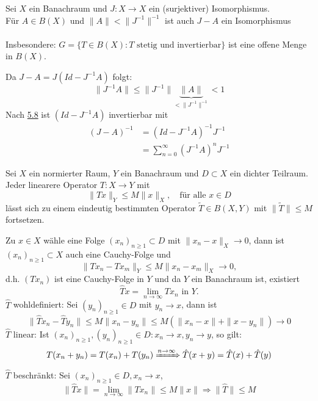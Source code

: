 \begin{kor} \label{kor:5.9}
	Sei $X$ ein Banachraum und $J: X \rightarrow X$ ein (surjektiver) Isomorphismus. \\
	Für $A \in B(X)$ und $\| A \| < \| J^{-1} \|^{-1}$ ist auch $J - A$ ein Isomorphismus \\ \\
	Insbesondere: $G = \{ T \in B(X): T \text{ stetig und invertierbar} \}$ ist eine offene Menge in $B(X)$.
	\begin{beweis}
		Da $J - A = J (Id - J^{-1}A) $ folgt:
		\[ \| J^{-1} A \| \leq \| J^{-1} \| \underbrace{\| A \|}_{< \| J^{-1} \|^{-1}} < 1 \]
		Nach \hyperref[prop:5.8-NeumannscheReihe]{5.8} ist $(Id - J^{-1} A)$ invertierbar mit
			\begin{align*}
				(J - A)^{-1} & = (Id - J^{-1} A)^{-1} J^{-1} \\
					& = \sum_{n = 0}^{\infty} (J^{-1} A)^{n} J^{-1}
			\end{align*}
	\end{beweis}
\end{kor}


\begin{prop} \label{prop:5.10}
	Sei $X$ ein normierter Raum, $Y$ ein Banachraum und $D \subset X$ ein dichter Teilraum. \\
	Jeder linearere Operator $T: X \rightarrow Y$ mit
		\[ \| T x \|_{Y} \leq M \| x \|_{X}, \quad \text{für alle } x \in D \]
	lässt sich zu einem eindeutig bestimmten Operator $ \tilde T \in B(X, Y)$ mit $\| \tilde T \| \leq M	$ fortsetzen.	
\end{prop} 

\begin{beweis}
	Zu $x \in X$ wähle eine Folge $(x_{n})_{n \geq 1} \subset D$ mit $\| x_{n} - x \|_{X} \rightarrow 0$, dann ist $(x_{n})_{n \geq 1} \subset X$ auch eine Cauchy-Folge und
	\[ \| T x_{n} - T x_{m} \|_{Y} \leq M \|x_{n} - x_{m} \|_{X} \rightarrow 0,  \]
	d.h. $(Tx_{n})$ ist eine Cauchy-Folge in $Y$ und da $Y$ ein Banachraum ist, existiert 
		\[ \hat T x = \lim_{n \rightarrow \infty} T x_{n} \text{ in } Y. \]
	$\hat T$ wohldefiniert: Sei $(y_{n})_{n \geq 1} \in D$ mit $y_{n} \rightarrow x$, dann ist 
		\[ \| \hat T x_{n} - \hat T y_{n} \| \leq M \| x_{n} - y_{n} \| \leq M \left( \| x_{n} - x \| + \| x - y_{n} \| \right) \rightarrow 0 \]
	$\hat T$ linear: Ist $(x_{n})_{n \geq 1}, (y_{n})_{n \geq 1} \in D : x_{n} \rightarrow x, y_{n} \rightarrow y$, so gilt:
		\[ T(x_{n} + y_{n}) = T(x_{n}) + T(y_{n}) \xRightarrow[]{n \rightarrow \infty} \hat T(x + y) = \hat T(x) + \hat T(y) \]
	$\hat T$ beschränkt: Sei $(x_{n})_{n \geq 1} \in D, x_{n} \rightarrow x$,
	\[ \| \hat T x \| = \lim_{n \rightarrow \infty} \| T x_{n} \| \leq M \| x \| \Rightarrow \| \hat T \| \leq M \]
\end{beweis}


